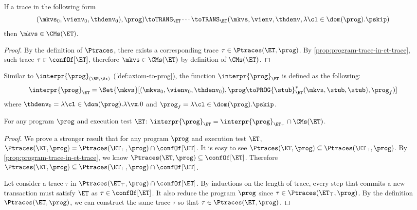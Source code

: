 \begin{corollary}
If a trace in the following form
\[
    (\mkvs_{0}, \vienv_{0}, \thdenv_{0}), \prog) \toTRANS_{\ET} \cdots \toTRANS_{\ET} 
    (\mkvs, \vienv, \thdenv, \lambda \cl \in \dom(\prog). \pskip)
\]
then $\mkvs \in \CMs(\ET)$.
\end{corollary}
\begin{proof}
    By the definition of \( \Ptraces \), 
    there exists a corresponding trace \( \tau \in \Ptraces(\ET, \prog) \).
    By \cref{prop:program-trace-in-et-trace}, such trace \( \tau \in \confOf[\ET] \),
    therefore \( \mkvs \in \CMs(\ET)\) by definition of \( \CMs(\ET) \).
\end{proof}

Similar to \( \interpr{\prog}_{(\RP,\Ax)} \) (\cref{def:axiom-to-prog}), the function \( \interpr{\prog}_{\ET} \) is defined as the following:
\[
    \interpr{\prog}_{\ET} = \Set{ \mkvs }[ (\mkvs_{0}, \vienv_0, \thdenv_{0} ), \prog \toPROG{\stub}_{\ET}^{\ast} (\mkvs, \stub, \stub ), \prog_{f}) ]
\]
where $\thdenv_{0} = \lambda \cl \in \dom(\prog).\lambda \vx.0$ and $\prog_{f} = \lambda \cl \in \dom(\prog).\pskip$.

\begin{proposition}
    \label{thm:consistency-intersect-permissive}
    For any program $\prog$ and execution test $\ET$:
    \( \interpr{\prog}_{\ET} = \interpr{\prog}_{\ET_\top}  \cap \CMs(\ET) \).
\end{proposition}
\begin{proof}
    We prove a stronger result that for any program $\prog$ and execution test $\ET$, $\Ptraces(\ET, \prog) = \Ptraces(\ET_{\top}, \prog) \cap \confOf[\ET]$.
    It is easy to see \(\Ptraces(\ET, \prog) \subseteq \Ptraces(\ET_\top, \prog) \).
    By \cref{prop:program-trace-in-et-trace}, we know \( \Ptraces(\ET, \prog) \subseteq \confOf[\ET]\).
    Therefore \(  \Ptraces(\ET, \prog) \subseteq \Ptraces(\ET_\top, \prog) \cap \confOf[\ET] \).

    Let consider a trace \( \tau \) in \( \Ptraces(\ET_\top, \prog) \cap \confOf[\ET] \).
    By inductions on the length of trace, 
    every step that commits a new transaction  must satisfy \( \ET \) as \( \tau \in \confOf[\ET] \).
    It also reduce the program \( \prog \) since \( \tau \in \Ptraces(\ET_\top, \prog) \).
    By the definition \( \Ptraces(\ET, \prog) \), we can construct the same trace \( \tau \) so that \( \tau \in \Ptraces(\ET, \prog) \).
\end{proof}
